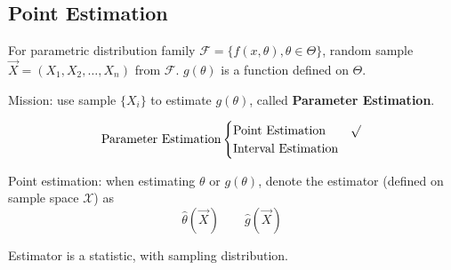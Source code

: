 \subsection{Point Estimation}\label{SectionPointEstimation}
    For parametric distribution family $\mathscr{F}=\{f(x,\theta),\theta\in\Theta\}$, random sample $\vec{X}=(X_1,X_2,\ldots,X_n)$ from $\mathscr{F}$. $g(\theta)$ is a function defined on $\Theta$. 

    Mission: use sample $\{X_i\}$ to estimate $g(\theta)$, called \textbf{Parameter Estimation}.

    \begin{equation}
        \text{Parameter Estimation}\begin{cases}
            \text{Point Estimation}& \surd\\
            \text{Interval Estimation}&
        \end{cases}    
    \end{equation}

    Point estimation: when estimating $\theta$ or $g(\theta)$, denote the estimator (defined on sample space $\mathscr{X}$) as
    \begin{equation}
        \hat{\theta}(\vec{X})\qquad \hat{g}(\vec{X})    
    \end{equation}

    Estimator is a statistic, with sampling distribution.
